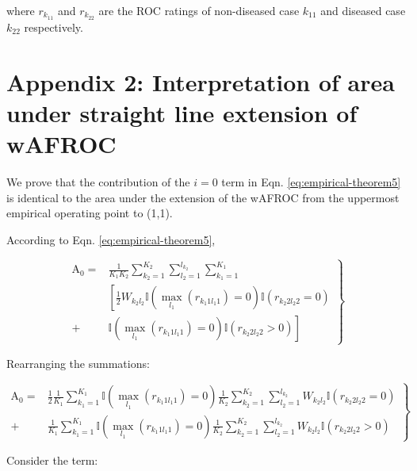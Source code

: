 \documentclass[
]{book}
\begin{document}
where \(r_{k_11}\) and \(r_{k_22}\) are the ROC ratings of non-diseased case \(k_11\) and diseased case \(k_22\) respectively.

\hypertarget{empirical-theorem-2}{%
\section{Appendix 2: Interpretation of area under straight line extension of wAFROC}\label{empirical-theorem-2}}

We prove that the contribution of the \(i = 0\) term in Eqn. \eqref{eq:empirical-theorem5} is identical to the area under the extension of the wAFROC from the uppermost empirical operating point to (1,1).

According to Eqn. \eqref{eq:empirical-theorem5},

\begin{equation}
\left. 
\begin{aligned}
\text{A}_0 =& \frac{1}{K_1K_2}  \sum_{k_2=1}^{K_2} \sum_{l_2=1}^{l_{k_2}}\sum_{k_1=1}^{K_1} \\
&\left [ \frac{1}{2} W_{k_2l_2} \mathbb{I}\left ( \max_{l_1} \left (r_{k_1 1 l_1 1}  \right ) = 0  \right )\mathbb{I}\left ( r_{k_2 2 l_2 2} = 0 \right ) \right. \\
+& \left. \mathbb{I}\left ( \max_{l_1} \left (r_{k_1 1 l_1 1}  \right ) = 0  \right )\mathbb{I}\left ( r_{k_2 2 l_2 2} > 0 \right )  \right ]
\end{aligned}
\right \} 
\label{eq:empirical-theorem8}
\end{equation}

Rearranging the summations:

\begin{equation}
\left. 
\begin{aligned}
\text{A}_0 =& 
\frac{1}{2} \frac{1}{K_1} \sum_{k_1=1}^{K_1}\mathbb{I}\left ( \max_{l_1} \left (r_{k_1 1 l_1 1}  \right ) = 0  \right ) \frac{1}{K_2} \sum_{k_2=1}^{K_2} \sum_{l_2=1}^{l_{k_2}} W_{k_2l_2} \mathbb{I}\left ( r_{k_2 2 l_2 2} = 0 \right ) \\
+& \frac{1}{K_1} \sum_{k_1=1}^{K_1}\mathbb{I}\left ( \max_{l_1} \left (r_{k_1 1 l_1 1}  \right ) = 0  \right ) \frac{1}{K_2} \sum_{k_2=1}^{K_2} \sum_{l_2=1}^{l_{k_2}} W_{k_2l_2} \mathbb{I}\left ( r_{k_2 2 l_2 2} > 0 \right )
\end{aligned}
\right \} 
\label{eq:empirical-theorem9}
\end{equation}

Consider the term:
\end{document}
